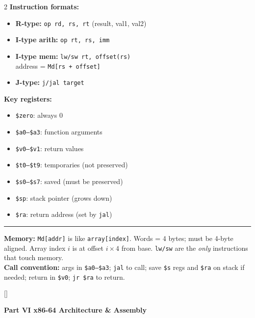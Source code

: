 \documentclass[11pt, letterpaper]{article}
\newcommand{\redsections}{%
  \titleformat{\section}{\large\bfseries\color{sectionred}}{}{0em}{}[\color{sectionred}\titlerule]%
  \titleformat{\subsection}{\normalsize\bfseries\color{sectionred!80!black}}{}{0em}{}%
}
\newcommand{\partbanner}[3]{%
  \begin{tcolorbox}[colback=#1, colframe=#2, boxrule=1.2pt, arc=4pt,
    left=8pt, right=8pt, top=6pt, bottom=6pt]
    \begin{center}{\LARGE\bfseries #3}\end{center}
  \end{tcolorbox}%
}
\newcommand{\divider}{\par\noindent\rule{\textwidth}{0.4pt}\par\vspace{2pt}}
\begin{document}
\begin{tcolorbox}[colback=partbg, colframe=sectionblue,
  title={\bfseries MIPS Assembly Quick Reference}, arc=3pt, boxrule=1pt]
\footnotesize
\begin{multicols}{2}
\textbf{Instruction formats:}
\begin{itemize}[noitemsep, leftmargin=*]
  \item \textbf{R-type:} \texttt{op rd, rs, rt} \quad (result, val1, val2)
  \item \textbf{I-type arith:} \texttt{op rt, rs, imm}
  \item \textbf{I-type mem:} \texttt{lw/sw rt, offset(rs)}\\
        \quad address = \texttt{Md[rs + offset]}
  \item \textbf{J-type:} \texttt{j/jal target}
\end{itemize}
\columnbreak
\textbf{Key registers:}
\begin{itemize}[noitemsep, leftmargin=*]
  \item \texttt{\$zero}: always 0
  \item \texttt{\$a0--\$a3}: function arguments
  \item \texttt{\$v0--\$v1}: return values
  \item \texttt{\$t0--\$t9}: temporaries (not preserved)
  \item \texttt{\$s0--\$s7}: saved (must be preserved)
  \item \texttt{\$sp}: stack pointer (grows down)
  \item \texttt{\$ra}: return address (set by \texttt{jal})
\end{itemize}
\end{multicols}
\divider
\textbf{Memory:} \texttt{Md[addr]} is like \texttt{array[index]}. Words = 4 bytes; must be 4-byte aligned. Array index $i$ is at offset $i \times 4$ from base. \texttt{lw/sw} are the \emph{only} instructions that touch memory.\\[2pt]
\textbf{Call convention:} args in \texttt{\$a0--\$a3}; \texttt{jal} to call; save \texttt{\$s} regs and \texttt{\$ra} on stack if needed; return in \texttt{\$v0}; \texttt{jr \$ra} to return.
\end{tcolorbox}

\newpage

\redsections
{}
\partbanner{part6bg}{sectionred}{Part VI \quad x86-64 Architecture \& Assembly}
\end{document}
